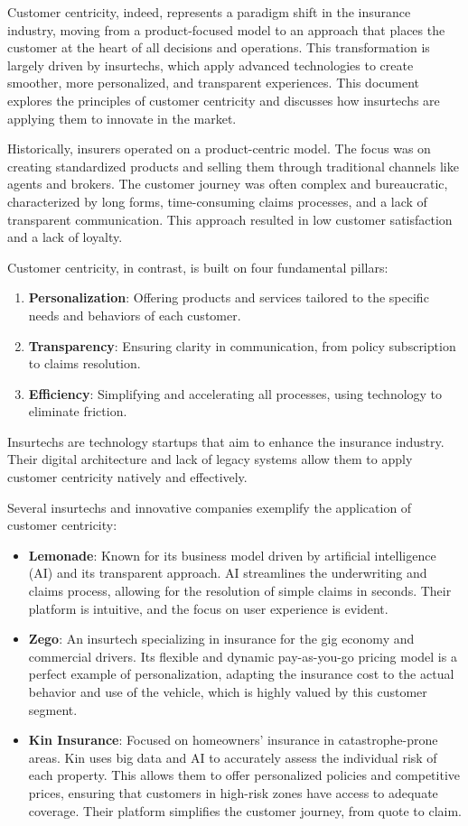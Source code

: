 \documentclass{article}
\begin{document}
Customer centricity, indeed, represents a paradigm shift in the insurance industry, moving from a product-focused model to an approach that places the customer at the heart of all decisions and operations. This transformation is largely driven by insurtechs, which apply advanced technologies to create smoother, more personalized, and transparent experiences. This document explores the principles of customer centricity and discusses how insurtechs are applying them to innovate in the market.


Historically, insurers operated on a product-centric model. The focus was on creating standardized products and selling them through traditional channels like agents and brokers. The customer journey was often complex and bureaucratic, characterized by long forms, time-consuming claims processes, and a lack of transparent communication. This approach resulted in low customer satisfaction and a lack of loyalty.


Customer centricity, in contrast, is built on four fundamental pillars:
\begin{enumerate}
\item \textbf{Personalization}: Offering products and services tailored to the specific needs and behaviors of each customer.
\item \textbf{Transparency}: Ensuring clarity in communication, from policy subscription to claims resolution.
\item \textbf{Efficiency}: Simplifying and accelerating all processes, using technology to eliminate friction.
\end{enumerate}


Insurtechs are technology startups that aim to enhance the insurance industry. Their digital architecture and lack of legacy systems allow them to apply customer centricity natively and effectively.


Several insurtechs and innovative companies exemplify the application of customer centricity:
\begin{itemize}
\item \textbf{Lemonade}: Known for its business model driven by artificial intelligence (AI) and its transparent approach. AI streamlines the underwriting and claims process, allowing for the resolution of simple claims in seconds. Their platform is intuitive, and the focus on user experience is evident.
\item \textbf{Zego}: An insurtech specializing in insurance for the gig economy and commercial drivers. Its flexible and dynamic pay-as-you-go pricing model is a perfect example of personalization, adapting the insurance cost to the actual behavior and use of the vehicle, which is highly valued by this customer segment.
\item \textbf{Kin Insurance}: Focused on homeowners' insurance in catastrophe-prone areas. Kin uses big data and AI to accurately assess the individual risk of each property. This allows them to offer personalized policies and competitive prices, ensuring that customers in high-risk zones have access to adequate coverage. Their platform simplifies the customer journey, from quote to claim.
\end{itemize}
\end{document}
